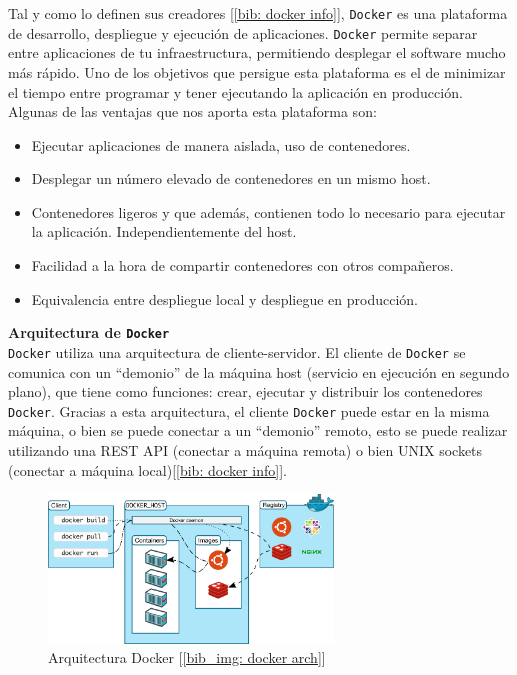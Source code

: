 \documentclass[12pt]{article}
\begin{document}
	\noindent Tal y como lo definen sus creadores [\ref{bib: docker info}], \texttt{Docker} es una plataforma de desarrollo, despliegue y ejecución de aplicaciones. \texttt{Docker} permite separar entre aplicaciones de tu infraestructura, permitiendo desplegar el software mucho más rápido. Uno de los objetivos que persigue esta plataforma es el de minimizar el tiempo entre programar y tener ejecutando la aplicación en producción. Algunas de las ventajas que nos aporta esta plataforma son:
	\begin{itemize}
		\item Ejecutar aplicaciones de manera aislada, uso de contenedores.
		\item Desplegar un número elevado de contenedores en un mismo host.
		\item Contenedores ligeros y que además, contienen todo lo necesario para ejecutar la aplicación. Independientemente del host.
		\item Facilidad a la hora de compartir contenedores con otros compañeros.
		\item Equivalencia entre despliegue local y despliegue en producción.
	\end{itemize}

	\vspace{5px}
	\noindent \textbf{\large Arquitectura de \texttt{Docker}}\\
	
	\noindent \texttt{Docker} utiliza una arquitectura de cliente-servidor. El cliente de \texttt{Docker} se comunica con un ``demonio'' de la máquina host (servicio en ejecución en segundo plano), que tiene como funciones: crear, ejecutar y distribuir los contenedores \texttt{Docker}. Gracias a esta arquitectura, el cliente \texttt{Docker} puede estar en la misma máquina, o bien se puede conectar a un ``demonio'' remoto, esto se puede realizar utilizando una REST API (conectar a máquina remota) o bien UNIX sockets (conectar a máquina local)[\ref{bib: docker info}]. 
	
	\begin{figure}[h]
		\begin{center}
			\includegraphics[width=0.675\textwidth]{img/architecture-docker.png}
			\caption{Arquitectura Docker [\ref{bib_img: docker arch}]}
		\end{center}
	\end{figure}
	
\end{document}
